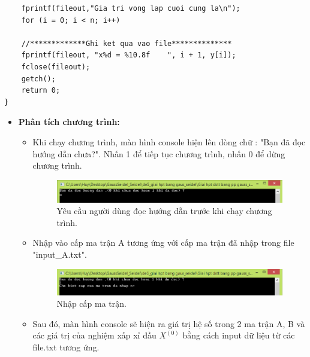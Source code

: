 \documentclass[12pt,a4paper]{article}
\begin{document}
{\begin{itemize}
\begin{lstlisting}
    fprintf(fileout,"Gia tri vong lap cuoi cung la\n");
    for (i = 0; i < n; i++)
    
    //*************Ghi ket qua vao file**************
    fprintf(fileout, "x%d = %10.8f    ", i + 1, y[i]);
 	fclose(fileout); 
 	getch();
 	return 0;
}
\end{lstlisting}

\end{itemize}

\newpage

\begin{itemize}
\item{\textbf{Phân tích chương trình: }}
\begin{itemize}
\item Khi chạy chương trình, màn hình console hiện lên dòng chữ : "Bạn đã đọc hướng dẫn chưa?". Nhấn 1 để tiếp tục chương trình, nhấn 0 để dừng chương trình.

\begin{center}
    \begin{figure}[htp]
    \begin{center}
     \includegraphics[scale=.7]{anh_1}
    \end{center}
    \caption{Yêu cầu người dùng đọc hướng dẫn trước khi chạy chương trình.}
    \label{refhinh1}
    \end{figure}
\end{center}

\item Nhập vào cấp ma trận A tương ứng với cấp ma trận đã nhập trong file "input\_A.txt".

\begin{center}
    \begin{figure}[htp]
    \begin{center}
     \includegraphics[scale=.7]{anh_2}
    \end{center}
    \caption{Nhập cấp ma trận.}
    \label{refhinh1}
    \end{figure}
\end{center}

\item Sau đó, màn hình console sẽ hiện ra giá trị hệ số trong 2 ma trận A, B và các giá trị của nghiệm xấp xỉ đầu $ X^{(0)}$ bằng cách input dữ liệu từ các file.txt tương ứng.


\end{itemize}
\end{itemize}}
\end{document}
